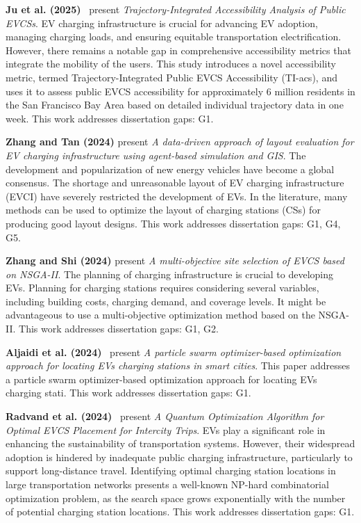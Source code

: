 \documentclass[letterpaper, 12pt, oneside, doublespacing]{Thesis}
\begin{document}
\noindent \textbf{Ju et al. (2025)}~\cite{trajectory-integrated_accessibility_2025} present \textit{Trajectory-Integrated Accessibility Analysis of Public EVCSs}. EV charging infrastructure is crucial for advancing EV adoption, managing charging loads, and ensuring equitable transportation electrification. However, there remains a notable gap in comprehensive accessibility metrics that integrate the mobility of the users. This study introduces a novel accessibility metric, termed Trajectory-Integrated Public EVCS Accessibility (TI-acs), and uses it to assess public EVCS accessibility for approximately 6 million residents in the San Francisco Bay Area based on detailed individual trajectory data in one week. This work addresses dissertation gaps: G1.



\noindent \textbf{Zhang and Tan (2024)} present \textit{A data-driven approach of layout evaluation for EV charging infrastructure using agent-based simulation and GIS}. The development and popularization of new energy vehicles have become a global consensus. The shortage and unreasonable layout of EV charging infrastructure (EVCI) have severely restricted the development of EVs. In the literature, many methods can be used to optimize the layout of charging stations (CSs) for producing good layout designs. This work addresses dissertation gaps: G1, G4, G5.



\noindent \textbf{Zhang and Shi (2024)} present \textit{A multi-objective site selection of EVCS based on NSGA-II}. The planning of charging infrastructure is crucial to developing EVs. Planning for charging stations requires considering several variables, including building costs, charging demand, and coverage levels. It might be advantageous to use a multi-objective optimization method based on the NSGA-II. This work addresses dissertation gaps: G1, G2.



\noindent \textbf{Aljaidi et al. (2024)}~\cite{a_particle_2024} present \textit{A particle swarm optimizer-based optimization approach for locating EVs charging stations in smart cities}. This paper addresses a particle swarm optimizer-based optimization approach for locating EVs charging stati. This work addresses dissertation gaps: G1.



\noindent \textbf{Radvand et al. (2024)}~\cite{a_quantum_2024} present \textit{A Quantum Optimization Algorithm for Optimal EVCS Placement for Intercity Trips}. EVs play a significant role in enhancing the sustainability of transportation systems. However, their widespread adoption is hindered by inadequate public charging infrastructure, particularly to support long-distance travel. Identifying optimal charging station locations in large transportation networks presents a well-known NP-hard combinatorial optimization problem, as the search space grows exponentially with the number of potential charging station locations. This work addresses dissertation gaps: G1.
\end{document}
